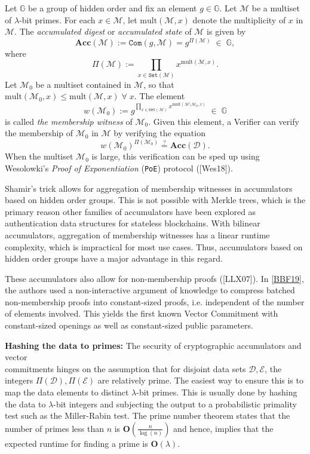 \documentclass[11pt, lettersize, notitlepage, leqno, footskip=0.6cm]{article}
\newcommand{\pl}{\prod\limits}
\newcommand{\ttt}{\texttt}
\newcommand{\bG}{\mathbb{G}}
\newcommand{\Acc}{\mbf{Acc}}
\newcommand{\sett}{\ttt{Set}}
\newcommand{\mult}{\mr{mult}}
\newcommand{\mc}{\mathcal}
\newcommand{\mb}{\mathbb}
\newcommand{\mbf}{\mathbf}
\newcommand{\mr}{\mathrm}
\newcommand{\sm}{\setminus}
\newcommand{\lam}{\lambda}
\newcommand{\mcM}{\mc{M}}
\newcommand{\vs}{\vspace{-0.15cm}}
\newcommand{\noin}{\noindent}
\newcommand{\sta}{\stackrel{?}{=}}
\numberwithin{equation}{section}
\begin{document}
Let $\mb{G}$ be a group of hidden order and fix an element $g \in\mb{G}$. Let $\mc{M}$ be a multiset of $\lam$-bit primes. For each $x\in \mc{M}$, let $\mult(\mc{M},x)$ denote the multiplicity of $x$ in $\mcM$. The \textit{accumulated digest} or \textit{accumulated state} of $\mc{M}$ is given by \vs $$\Acc(\mc{M}):= \ttt{Com}(g,\mcM) =   g^{\Pi(\mc{M})} \;\in\;\bG,$$ where $$\Pi(\mc{M}) := \pl_{x\in \sett(\mc{M})} x^{\mult(\mc{M},x)} .$$ Let $\mc{M}_0$ be a multiset contained in $\mc{M}$, so that  $\mult(\mc{M}_0,x)\leq \mult(\mc{M},x)\;\forall\;x$. The element \vs $$w(\mc{M}_0):= g^{\pl_{x\in \sett(\mc{M})} x^{\mult(\mc{M}\sm \mc{M}_0 ,x)}}\;\in\;\mb{G} $$ is called \textit{the membership witness} of $\mc{M}_0$. Given this element, a Verifier can verify the membership of $\mc{M}_0$ in $\mc{M}$ by verifying the equation \vs $$w(\mc{M}_0)^{\Pi(\mc{M}_0)} \sta \Acc(\mc{D}).$$ When the multiset $\mc{M}_0$ is large, this verification can be sped up using Wesolowki's \textit{Proof of Exponentiation} (\verb|PoE|) protocol ([Wes18]).

Shamir's trick allows for aggregation of membership witnesses in accumulators based on hidden order groups. This is not possible with Merkle trees, which is the primary reason other families of accumulators have been explored as authentication data structures for stateless blockchains. With bilinear accumulators, aggregation of membership witnesses has a linear runtime complexity, which is impractical for most use cases. Thus, accumulators based on hidden order groups have a major advantage in this regard.

These accumulators also allow for non-membership proofs ([LLX07]). In \hyperlink{BBF19}{[BBF19]}, the authors used a non-interactive argument of knowledge to compress batched non-membership proofs into constant-sized proofs, i.e. independent of the number of elements involved. This yields the first known Vector Commitment with constant-sized openings as well as  constant-sized public parameters.\vspace{0.15cm}

\noin \textbf{Hashing the data to primes:} The security of cryptographic accumulators and vector\\ commitments hinges on the assumption that for disjoint data sets $\mc{D},\mc{E}$, the integers $\Pi(\mc{D}), \Pi(\mc{E})$ are relatively prime. The easiest way to ensure this is to map the data elements to distinct $\lam$-bit primes. This is usually done by hashing the data to $\lam$-bit integers and subjecting the output to a probabilistic primality test such as the Miller-Rabin test. The prime number theorem states that the number of primes less than $n$ is $\mbf{O}(\frac{n}{\log(n)})$ and hence, implies that the expected runtime for finding a prime is $\mbf{O}(\lam)$.
\end{document}
